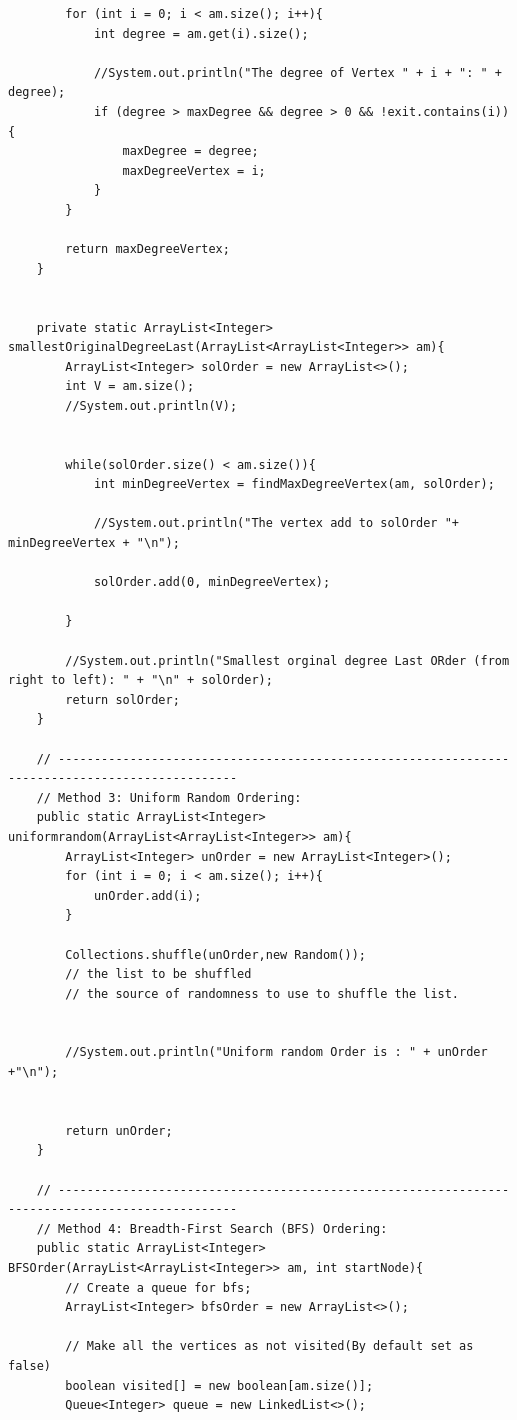 \documentclass{article}
\begin{document}
\begin{verbatim}
        for (int i = 0; i < am.size(); i++){
            int degree = am.get(i).size();

            //System.out.println("The degree of Vertex " + i + ": " + degree);
            if (degree > maxDegree && degree > 0 && !exit.contains(i)){
                maxDegree = degree;
                maxDegreeVertex = i;
            }
        }

        return maxDegreeVertex;
    }


    private static ArrayList<Integer> smallestOriginalDegreeLast(ArrayList<ArrayList<Integer>> am){
        ArrayList<Integer> solOrder = new ArrayList<>();
        int V = am.size();
        //System.out.println(V);


        while(solOrder.size() < am.size()){
            int minDegreeVertex = findMaxDegreeVertex(am, solOrder);

            //System.out.println("The vertex add to solOrder "+ minDegreeVertex + "\n");

            solOrder.add(0, minDegreeVertex);

        }

        //System.out.println("Smallest orginal degree Last ORder (from right to left): " + "\n" + solOrder);
        return solOrder;
    }

    // -----------------------------------------------------------------------------------------------
    // Method 3: Uniform Random Ordering:
    public static ArrayList<Integer> uniformrandom(ArrayList<ArrayList<Integer>> am){
        ArrayList<Integer> unOrder = new ArrayList<Integer>();
        for (int i = 0; i < am.size(); i++){
            unOrder.add(i);
        }

        Collections.shuffle(unOrder,new Random());
        // the list to be shuffled
        // the source of randomness to use to shuffle the list.


        //System.out.println("Uniform random Order is : " + unOrder +"\n");


        return unOrder;
    }

    // -----------------------------------------------------------------------------------------------
    // Method 4: Breadth-First Search (BFS) Ordering:
    public static ArrayList<Integer> BFSOrder(ArrayList<ArrayList<Integer>> am, int startNode){
        // Create a queue for bfs;
        ArrayList<Integer> bfsOrder = new ArrayList<>();

        // Make all the vertices as not visited(By default set as false)
        boolean visited[] = new boolean[am.size()];
        Queue<Integer> queue = new LinkedList<>();


\end{verbatim}
\end{document}
